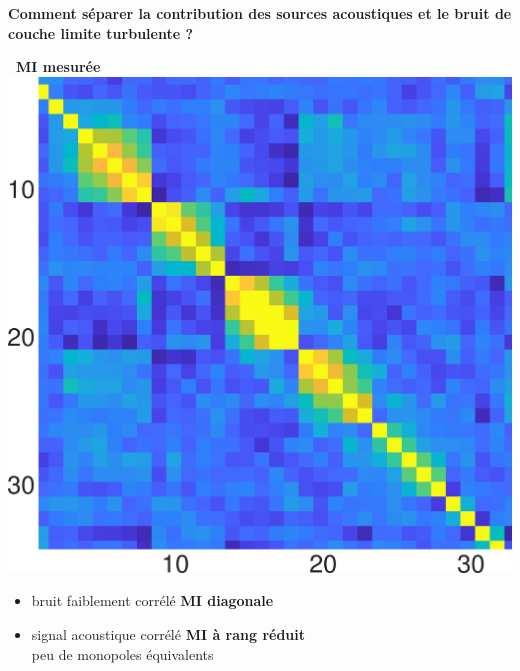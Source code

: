 \documentclass[10pt,xcolor=x11names,compress, show notes]{beamer}%
\newlength{\larg}	\setlength{\larg}{0.5cm}
\begin{document}
\begin{frame}
\centering
\textcolor{DeepSkyBlue4}{ \bfseries \large Comment séparer la contribution des sources acoustiques et le bruit de couche limite turbulente ?}\\[2ex]
\hspace{0cm}\begin{minipage}{0.20\textwidth}	
	\textbf{~MI mesurée}\\[1ex]
	 \includegraphics[width=\textwidth]{csm.png}\vfill
\end{minipage}\hfill
\begin{minipage}{0.75\textwidth}
	\hspace{1cm}
	\begin{itemize}
	        \item \textcolor{rouge}{bruit} faiblement corrélé  \textbf{MI diagonale~~~~~~}
	        \item \textcolor{jaune}{signal} acoustique corrélé   \textbf{MI à rang réduit}\\  peu de monopoles équivalents \\~
	\end{itemize}
	

\end{minipage}
\end{frame}
\end{document}
